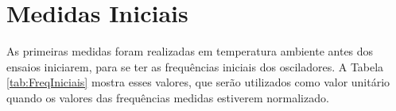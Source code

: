\section{Medidas Iniciais}
\label{sec:ResMedidasIniciais}

As primeiras medidas foram realizadas em temperatura ambiente antes dos ensaios iniciarem, para se ter as frequências iniciais dos osciladores. A Tabela \ref{tab:FreqIniciais} mostra esses valores, que serão utilizados como valor unitário quando os valores das frequências medidas estiverem normalizado.


